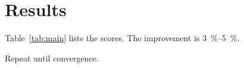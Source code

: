 \section{Results}

Table~\ref{tab:main} lists the scores.
The improvement is \SIrange{3}{5}{\percent}.

\begin{algorithm}
Repeat until convergence.
\end{algorithm}
